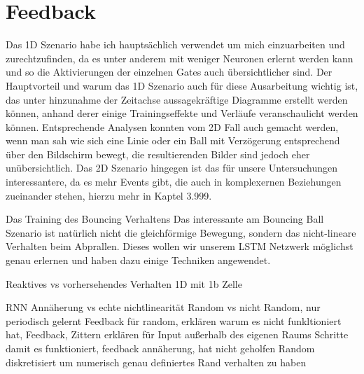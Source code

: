 \section{Feedback}

Das 1D Szenario habe ich hauptsächlich verwendet um mich einzuarbeiten und zurechtzufinden, da es unter anderem mit weniger Neuronen erlernt werden kann und so die Aktivierungen der einzelnen Gates auch übersichtlicher sind. Der Hauptvorteil und warum das 1D Szenario auch für diese Ausarbeitung wichtig ist, das unter hinzunahme der Zeitachse aussagekräftige Diagramme erstellt werden können, anhand derer einige Trainingseffekte und Verläufe veranschaulicht werden können. Entsprechende Analysen konnten vom 2D Fall auch gemacht werden, wenn man sah wie sich eine Linie  oder ein Ball mit Verzögerung entsprechend über den Bildschirm bewegt, die resultierenden Bilder sind jedoch eher unübersichtlich. Das 2D Szenario hingegen ist das für unsere Untersuchungen interessantere, da es mehr Events gibt, die auch in komplexernen Beziehungen zueinander stehen, hierzu mehr in Kaptel 3.999.

Das Training des Bouncing Verhaltens
Das interessante am Bouncing Ball Szenario ist natürlich nicht die gleichförmige Bewegung, sondern das nicht-lineare Verhalten beim Abprallen. Dieses wollen wir unserem LSTM Netzwerk möglichst genau erlernen und haben dazu einige Techniken angewendet. 

Reaktives vs vorhersehendes Verhalten
1D mit 1b Zelle

RNN Annäherung vs echte nichtlinearität
Random vs nicht Random, nur periodisch gelernt
Feedback für random, erklären warum es nicht funkltioniert hat,
Feedback, Zittern erklären für Input außerhalb des eigenen Raums
Schritte damit es funktioniert, feedback annäherung, hat nicht geholfen
Random diskretisiert um numerisch genau definiertes Rand verhalten zu haben